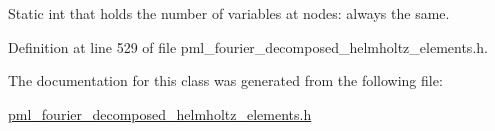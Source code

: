 Static int that holds the number of variables at nodes\+: always the same. 



Definition at line 529 of file pml\+\_\+fourier\+\_\+decomposed\+\_\+helmholtz\+\_\+elements.\+h.



The documentation for this class was generated from the following file\+:\begin{DoxyCompactItemize}
\item 
\hyperlink{pml__fourier__decomposed__helmholtz__elements_8h}{pml\+\_\+fourier\+\_\+decomposed\+\_\+helmholtz\+\_\+elements.\+h}\end{DoxyCompactItemize}
